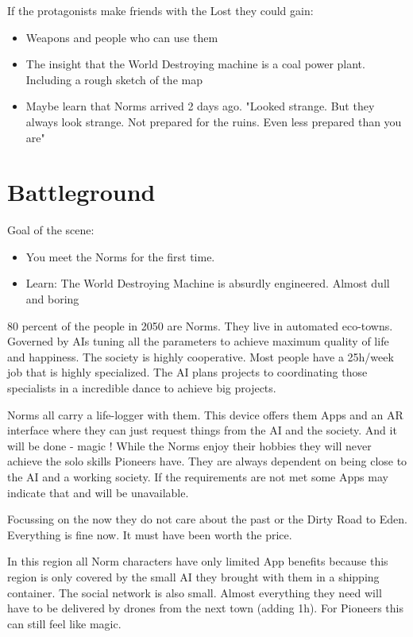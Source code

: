 If the protagonists make friends with the Lost they could gain:

\begin{itemize}
    \item Weapons and people who can use them
    \item The insight that the World Destroying machine is a coal power plant. Including a rough sketch of the map
    \item Maybe learn that Norms arrived 2 days ago. "Looked strange. But they always look strange. Not prepared for the ruins. Even less prepared than you are"
\end{itemize}

\section{Battleground}

Goal of the scene:

\begin{itemize}
\item You meet the Norms for the first time.
\item Learn: The World Destroying Machine is absurdly engineered. Almost dull and boring
\end{itemize}

\begin{sidebarBox}[title=Norms]

80 percent of the people in 2050 are Norms. They live in automated eco-towns. Governed by AIs tuning all the parameters to achieve maximum quality of life and happiness. The society is highly cooperative. Most people have a 25h/week job that is highly specialized. The AI plans projects to coordinating those specialists in a incredible dance to achieve big projects.

Norms all carry a life-logger with them. This device offers them Apps and an AR interface where they can just request things from the AI and the society. And it will be done - magic !
While the Norms enjoy their hobbies they will never achieve the solo skills Pioneers have. They are always dependent on being close to the AI and a working society. If the requirements are not met some Apps may indicate that and will be unavailable.

Focussing on the now they do not care about the past or the Dirty Road to Eden. Everything is fine now. It must have been worth the price.

In this region all Norm characters have only limited App benefits because this region is only covered by the small AI they brought with them in a shipping container. The social network is also small. Almost everything they need will have to be delivered by drones from the next town (adding 1h). For Pioneers this can still feel like magic.

\end{sidebarBox}

